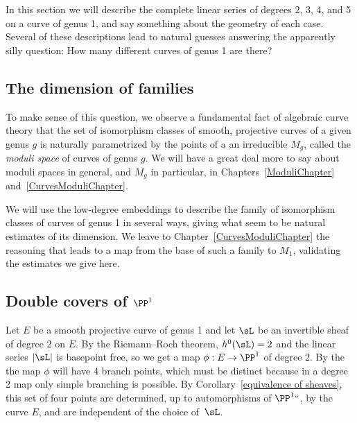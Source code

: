 In this section we will describe the complete linear series of degrees
2, 3, 4, and 5 on a curve of genus 1, and say something
about the geometry of each case. Several of these descriptions lead to natural guesses answering the
apparently silly question: How many different curves of genus 1 are there? 

\subsection*{The dimension of families}

To make sense of this question, we observe a fundamental fact of
algebraic curve theory that the set of isomorphism classes of smooth,
projective curves of a given genus $g$ is naturally parametrized by
the points of a 
%
%
%
an irreducible 
%
$M_g$, called the \emph{moduli space} of curves of genus $g$. We will
have a great deal more to say about moduli spaces in general, and
$M_g$ in particular, in Chapters~\ref{ModuliChapter}
and~\ref{CurvesModuliChapter}. 

We will use the low-degree embeddings  to describe the family of
isomorphism classes of curves of genus 1 in several ways, giving
what seem to be natural estimates of its dimension. We leave to Chapter~\ref{CurvesModuliChapter} the reasoning that leads to a map from the base of such a family to $M_{1}$, validating the estimates we give here.

\subsection*{Double covers of $\PP^1$}

Let $E$ be a smooth projective curve of genus 1 and let  $\sL$ be an
%
invertible sheaf of degree 2 on $E$. By the Riemann--Roch theorem,
$h^0(\sL) = 2$ and the linear series $|\sL|$ is basepoint free, so we
get a map $\phi : E \to \PP^1$ of degree 2. By the 
%
the map $\phi$ will have 4 branch points, which must be
distinct because in a degree 2 map 
%
only simple branching is possible. By Corollary~\ref{equivalence of sheaves}, this set of four points are determined, up to automorphisms of $\PP^1` `$, by the curve $E$, and are independent of the choice of~$\sL$. 

